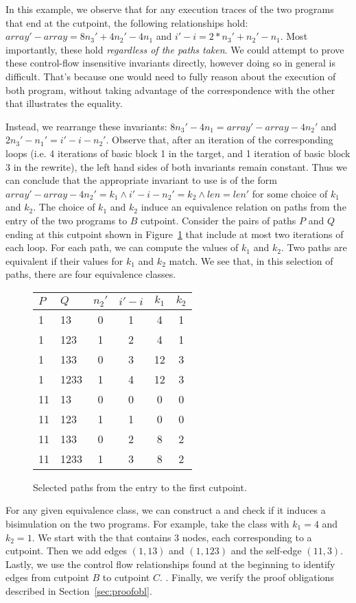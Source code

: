 In this example, we observe that for any execution traces of the two
programs that end at the cutpoint, the following relationships hold:
$array' - array = 8n_3' + 4n_2' - 4n_1$ and $i' - i = 2*n_3' + n_2'
- n_1$. Most importantly, these hold \emph{regardless of the paths
taken}. We could attempt to prove these control-flow insensitive
invariants directly, however doing so in general is difficult. That's
because one would need to fully reason about the execution of both
program, without taking advantage of the correspondence with the other
that illustrates the equality.

Instead, we rearrange these invariants: $8n_3' - 4n_1 = array' - array
- 4n_2'$ and $2n_3' - n_1' = i' - i - n_2'$. Observe that, after an
iteration of the corresponding loops (i.e. 4 iterations of basic block
1 in the target, and 1 iteration of basic block 3 in the rewrite),
the left hand sides of both invariants remain constant. Thus we can
conclude that the appropriate invariant to use is of the form $array'
- array - 4n_2' = k_1 \wedge i' - i - n_2' = k_2 \wedge len = len'$
for some choice of $k_1$ and $k_2$. The choice of $k_1$ and $k_2$
induce an equivalence relation on paths from the entry of the two
programs to $B$ cutpoint. Consider the pairs of paths $P$ and $Q$
ending at this cutpoint shown in Figure~\ref{fig:egpaths} that include
at most two iterations of each loop. For each path, we can compute the
values of $k_1$ and $k_2$. Two paths are equivalent if their values
for $k_1$ and $k_2$ match. We see that, in this selection of paths,
there are four equivalence classes.

\begin{figure}
\begin{tabular}{|ll|cccc|}
\hline
$P$       & $Q$ & $n_2'$ & $i'-i$ & $k_1$ & $k_2$ \\ \hline  \hline
1  & 13      &  0 & 1  & 4 & 1  \\
1  & 123     &  1 & 2  & 4 & 1  \\
1  & 133     &  0 & 3  & 12 & 3  \\
1  & 1233    &  1 & 4  & 12 & 3  \\
11 & 13      &  0 & 0  & 0 & 0  \\
11 & 123     &  1 & 1  & 0 & 0  \\
11 & 133     &  0 & 2  & 8 & 2  \\
11 & 1233    &  1 & 3  & 8 & 2  \\ \hline
\end{tabular}
\caption{Selected paths from the entry to the first cutpoint.}
\label{fig:egpaths}
\end{figure}

For any given equivalence class, we can construct a \bisimrep{} and
check if it induces a bisimulation on the two programs. For example,
take the class with $k_1 = 4$ and $k_2 = 1$. We start with the
\bisimrep{} that contains 3 nodes, each corresponding to a cutpoint.
Then we add edges $(1,13)$ and $(1,123)$ and the self-edge $(11,3)$.
Lastly, we use the control flow relationships found at the beginning
to identify edges from cutpoint $B$ to cutpoint $C$. . Finally, we verify the proof
obligations described in Section~\ref{sec:proofobl}.
